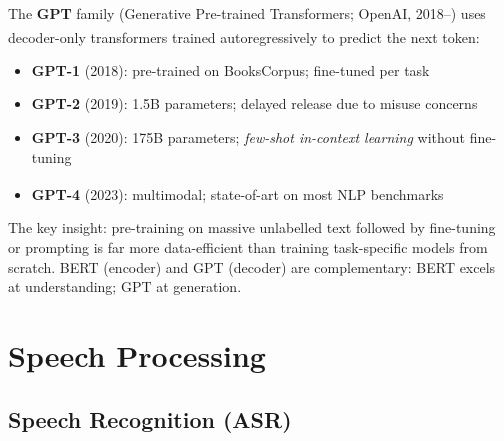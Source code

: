\begin{tcbitemize}[ skin=sectionraster ]
    \tcbitem[title={GPT: Pre-training for Generation}, raster multicolumn=3]
    The \textbf{GPT} family (Generative Pre-trained Transformers; OpenAI, 2018--) uses decoder-only transformers trained autoregressively to predict the next token\textsuperscript{\cite[][pp.~8--9]{dhamaniIntroductionGenerativeAI2024}}:
    \begin{itemize}
        \item \textbf{GPT-1} (2018): pre-trained on BooksCorpus; fine-tuned per task
        \item \textbf{GPT-2} (2019): 1.5B parameters; delayed release due to misuse concerns
        \item \textbf{GPT-3} (2020): 175B parameters; \emph{few-shot in-context learning} without fine-tuning
        \item \textbf{GPT-4} (2023): multimodal; state-of-art on most NLP benchmarks\textsuperscript{\cite[][]{openaiGPT4TechnicalReport2023}}
    \end{itemize}
    The key insight: pre-training on massive unlabelled text followed by fine-tuning or prompting is far more data-efficient than training task-specific models from scratch.
    BERT (encoder) and GPT (decoder) are complementary: BERT excels at understanding; GPT at generation.
\end{tcbitemize}

\section{Speech Processing}

\subsection{Speech Recognition (ASR)}

